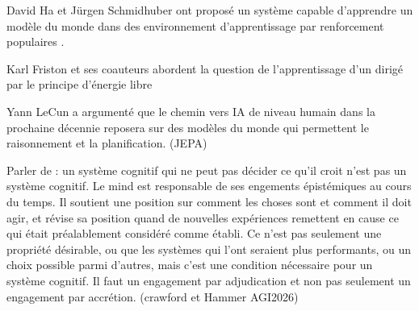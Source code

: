 David Ha et Jürgen Schmidhuber ont proposé un système capable d'apprendre un modèle du monde dans des environnement d'apprentissage par renforcement populaires \cite{ha_world_2018}.

Karl Friston et ses coauteurs abordent la question de l'apprentissage d'un  dirigé par le principe d'énergie libre \cite{friston_world_2021}

Yann LeCun a argumenté que le chemin vers IA de niveau humain dans la prochaine décennie reposera sur des modèles du monde qui permettent le raisonnement et la planification.
\og {} \fg (JEPA) \cite{balestriero_lejepa_2025}



Parler de : un système cognitif qui ne peut pas décider ce qu'il croit n'est pas un système cognitif.
Le mind est responsable de ses engements épistémiques au cours du temps. 
Il soutient une position sur comment les choses sont et comment il doit agir, et révise sa position quand de nouvelles expériences remettent en cause ce qui était préalablement considéré comme établi. 
Ce n'est pas seulement une propriété désirable, ou que les systèmes qui l'ont seraient plus performants, ou un choix possible parmi d'autres, mais c'est une condition nécessaire pour un système cognitif.
Il faut un engagement par adjudication et non pas seulement un engagement par accrétion. 
(crawford et Hammer AGI2026) 